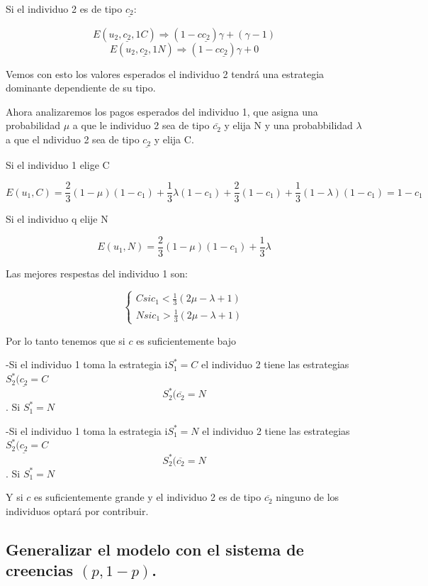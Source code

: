 \documentclass{article}
\begin{document}
Si el individuo 2 es de tipo $\underline{c_2}$:

$$E(u_2,\underline{c_2},1C)\Longrightarrow (1-c \underline{c_2})\gamma+(\gamma-1)$$
$$E(u_2,\underline{c_2},1N)\Longrightarrow (1-c \underline{c_2})\gamma+0$$

Vemos con esto los valores esperados el individuo 2 tendr\'a una estrategia dominante dependiente de su tipo.

Ahora analizaremos los pagos esperados del individuo 1, que asigna una probabilidad $\mu$ a que le individuo 2 sea de tipo $\bar{c_2}$ y elija N y una probabbilidad $\lambda$ a que el ndividuo 2 sea de tipo $\underline{c_2}$ y elija C.

Si el individuo 1 elige C 

$$E(u_1,C)=\frac{2}{3}(1-\mu)(1-c_1)+\frac{1}{3}\lambda(1-c_1)+\frac{2}{3}(1-c_1)+\frac{1}{3}(1-\lambda)(1-c_1)=1-c_1$$

Si el individuo q elije N

$$E(u_1,N)=\frac{2}{3}(1-\mu)(1-c_1)+\frac{1}{3}\lambda$$

Las mejores respestas del individuo 1 son:

$$\left\{ \begin{array}{c} C si c_1<\frac{1}{3}(2\mu-\lambda+1) \\ N si c_1>\frac{1}{3}(2\mu-\lambda+1)\end{array}\right. $$


Por lo tanto tenemos que si $c$ es suficientemente bajo

-Si el individuo 1 toma la estrategia  i$S_1^*=C$ el individuo 2 tiene las estrategias $S_2^*(\underline{c_2}=C$ $$S_2^*(\overline{c_2}=N$$. Si $S_1^*=N$ 

-Si el individuo 1 toma la estrategia  i$S_1^*=N$ el individuo 2 tiene las estrategias $S_2^*(\underline{c_2}=C$ $$S_2^*(\overline{c_2}=N$$. Si $S_1^*=N$ 


Y si $c$ es suficientemente grande y el individuo 2 es de tipo $\overline{c_2}$ ninguno de los individuos optar\'a por contribuir.



\subsection{Generalizar el modelo con el sistema de creencias $(p,1-p)$.}
\end{document}
